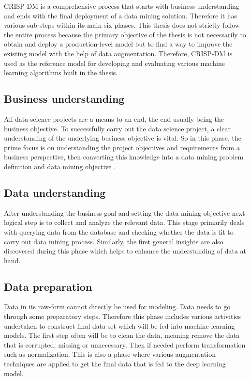 CRISP-DM is a comprehensive process that starts with business understanding and ends with the final deployment of a data mining solution. Therefore it has various sub-steps within its main six phases. This thesis does not strictly follow the entire process because the primary objective of the thesis is not necessarily to obtain and deploy a production-level model but to find a way to improve the existing model with the help of data augmentation. Therefore, CRISP-DM is used as the reference model for developing and evaluating various machine learning algorithms built in the thesis.

\subsection{Business understanding}
All data science projects are a means to an end, the end usually being the business objective. To successfully carry out the data science project, a clear understanding of the underlying business objective is vital. So in this phase, the prime focus is on understanding the project objectives and requirements from a business perspective, then converting this knowledge into a data mining problem definition and data mining objective \citep{chapman2000crisp}. 

\subsection{Data understanding}
After understanding the business goal and setting the data mining objective next logical step is to collect and analyze the relevant data. This stage primarily deals with querying data from the database and checking whether the data is fit to carry out data mining process. Similarly, the first general insights are also discovered during this phase which helps to enhance the understanding of data at hand.

\subsection{Data preparation} 
Data in its raw-form cannot directly be used for modeling. Data needs to go through some preparatory steps.
Therefore this phase includes various activities undertaken to construct final data-set which will be fed into machine learning models. The first step often will be to clean the data, meaning remove the data that is corrupted, missing or unnecessary. Then if needed perform transformation such as normalization. This is also a phase where various augmentation techniques are applied to get the final data that is fed to the deep learning model.

